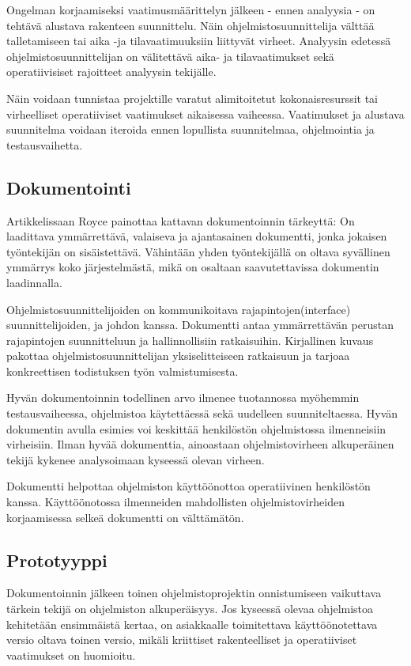 \documentclass[finnish]{tktltiki2}
\theoremstyle{definition}
\theoremstyle{remark}
\begin{document}
Ongelman korjaamiseksi vaatimusmäärittelyn jälkeen - ennen analyysia - on tehtävä alustava rakenteen suunnittelu. Näin ohjelmistosuunnittelija välttää talletamiseen tai aika -ja tilavaatimuuksiin liittyvät virheet. Analyysin edetessä ohjelmistosuunnittelijan on välitettävä aika- ja tilavaatimukset sekä operatiivisiset rajoitteet analyysin tekijälle\cite{ROY70}.

Näin voidaan tunnistaa projektille varatut alimitoitetut kokonaisresurssit tai virheelliset operatiiviset vaatimukset aikaisessa vaiheessa. Vaatimukset ja alustava suunnitelma voidaan iteroida ennen lopullista suunnitelmaa, ohjelmointia ja testausvaihetta\cite{ROY70}.

\subsection*{Dokumentointi}

Artikkelissaan Royce painottaa kattavan dokumentoinnin tärkeyttä: On laadittava ymmärrettävä, valaiseva ja ajantasainen dokumentti, jonka jokaisen työntekijän on sisäistettävä. Vähintään yhden työntekijällä on oltava syvällinen ymmärrys koko järjestelmästä, mikä on osaltaan saavutettavissa dokumentin laadinnalla\cite{ROY70}.

Ohjelmistosuunnittelijoiden on kommunikoitava rajapintojen(interface) suunnittelijoiden, ja johdon kanssa. Dokumentti antaa ymmärrettävän perustan rajapintojen suunnitteluun ja hallinnollisiin ratkaisuihin. Kirjallinen kuvaus pakottaa ohjelmistosuunnittelijan yksiselitteiseen ratkaisuun ja tarjoaa konkreettisen todistuksen työn valmistumisesta\cite{ROY70}.

Hyvän dokumentoinnin todellinen arvo ilmenee tuotannossa myöhemmin testausvaiheessa, ohjelmistoa käytettäessä sekä uudelleen suunniteltaessa. Hyvän dokumentin avulla esimies voi keskittää henkilöstön ohjelmistossa ilmenneisiin virheisiin. Ilman hyvää dokumenttia, ainoastaan ohjelmistovirheen alkuperäinen tekijä kykenee analysoimaan kyseessä olevan virheen\cite{ROY70}.

Dokumentti helpottaa ohjelmiston käyttöönottoa operatiivinen henkilöstön kanssa. Käyttöönotossa ilmenneiden mahdollisten ohjelmistovirheiden korjaamisessa selkeä dokumentti on välttämätön\cite{ROY70}.

\subsection*{Prototyyppi}

Dokumentoinnin jälkeen toinen ohjelmistoprojektin onnistumiseen vaikuttava tärkein tekijä on ohjelmiston alkuperäisyys. Jos kyseessä olevaa ohjelmistoa kehitetään ensimmäistä kertaa, on asiakkaalle toimitettava käyttöönotettava versio oltava toinen versio, mikäli kriittiset rakenteelliset ja operatiiviset vaatimukset on huomioitu\cite{ROY70}.
\end{document}

